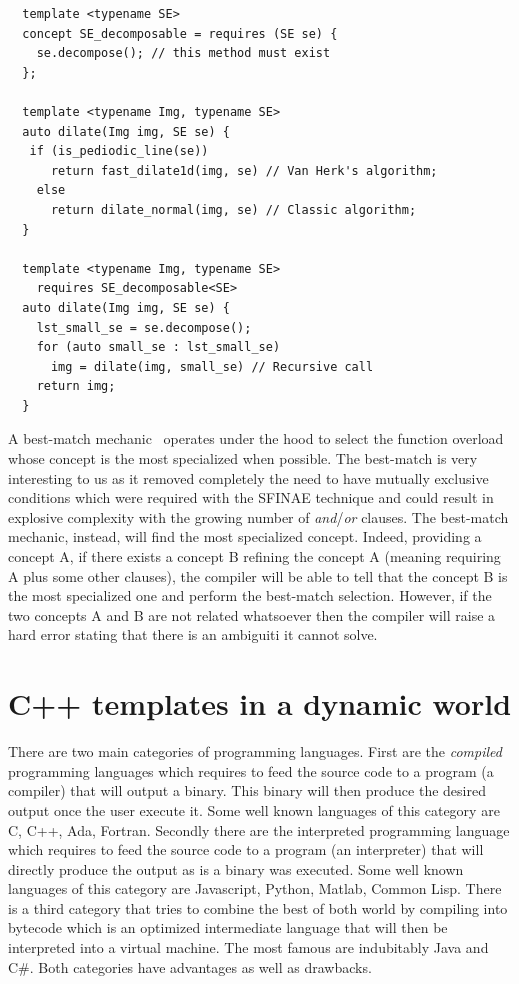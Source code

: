 \begin{verbatim}
  template <typename SE>
  concept SE_decomposable = requires (SE se) {
    se.decompose(); // this method must exist
  };

  template <typename Img, typename SE>
  auto dilate(Img img, SE se) {
   if (is_pediodic_line(se))
      return fast_dilate1d(img, se) // Van Herk's algorithm;
    else
      return dilate_normal(img, se) // Classic algorithm;
  }

  template <typename Img, typename SE>
    requires SE_decomposable<SE>
  auto dilate(Img img, SE se) {
    lst_small_se = se.decompose();
    for (auto small_se : lst_small_se)
      img = dilate(img, small_se) // Recursive call
    return img;
  }
\end{verbatim}
A best-match mechanic~\parencite{dosries.2066.specifying.proc} operates under the hood to select the function overload
whose concept is the most specialized when possible. The best-match is very interesting to us as it removed completely
the need to have mutually exclusive conditions which were required with the SFINAE technique and could result in
explosive complexity with the growing number of \emph{and}/\emph{or} clauses. The best-match mechanic, instead, will
find the most specialized concept. Indeed, providing a concept A, if there exists a concept B refining the concept A
(meaning requiring A plus some other clauses), the compiler will be able to tell that the concept B is the most
specialized one and perform the best-match selection. However, if the two concepts A and B are not related whatsoever
then the compiler will raise a hard error stating that there is an ambiguiti it cannot solve.

\section{C++ templates in a dynamic world}
\label{sec:template.dynworld}

There are two main categories of programming languages. First are the \emph{compiled} programming languages which
requires to feed the source code to a program (a compiler) that will output a binary. This binary will then produce the
desired output once the user execute it. Some well known languages of this category are C, C++, Ada, Fortran. Secondly
there are the interpreted programming language which requires to feed the source code to a program (an interpreter) that
will directly produce the output as is a binary was executed. Some well known languages of this category are Javascript,
Python, Matlab, Common Lisp. There is a third category that tries to combine the best of both world by compiling into
bytecode which is an optimized intermediate language that will then be interpreted into a virtual machine. The most
famous are indubitably Java and C\#. Both categories have advantages as well as drawbacks.

